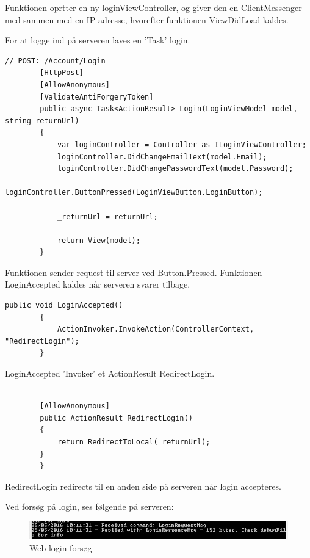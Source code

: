 Funktionen oprtter en ny loginViewController, og giver den en ClientMessenger med sammen med en IP-adresse, hvorefter funktionen ViewDidLoad kaldes.

For at logge ind på serveren laves en 'Task' login.

\begin{lstlisting}[caption=Login, label=code:Login]
 // POST: /Account/Login
        [HttpPost]
        [AllowAnonymous]
        [ValidateAntiForgeryToken]
        public async Task<ActionResult> Login(LoginViewModel model, string returnUrl)
        {
            var loginController = Controller as ILoginViewController;
            loginController.DidChangeEmailText(model.Email);
            loginController.DidChangePasswordText(model.Password);
            loginController.ButtonPressed(LoginViewButton.LoginButton);

            _returnUrl = returnUrl;

            return View(model);
        }
\end{lstlisting} 

Funktionen sender request til server ved Button.Pressed. Funktionen LoginAccepted kaldes når serveren svarer tilbage.

\begin{lstlisting}[caption=LoginAccepted, label=code:LoginAccepted]
public void LoginAccepted()
        {
            ActionInvoker.InvokeAction(ControllerContext, "RedirectLogin");
        }
\end{lstlisting}

LoginAccepted 'Invoker' et ActionResult RedirectLogin.
 
 \begin{lstlisting}[caption=Redirect Login, label=code:redirectlogin]

        [AllowAnonymous]
        public ActionResult RedirectLogin()
        {
            return RedirectToLocal(_returnUrl);
        }
        }
\end{lstlisting}

RedirectLogin redirects til en anden side på serveren når login accepteres.

Ved forsøg på login, ses følgende på serveren:

\begin{figure}
	\centering
	\includegraphics[width=1.0\linewidth]{figs/implementering/webtest}
	\caption{Web login forsøg}
	\label{fig:weblogintry}
\end{figure}

